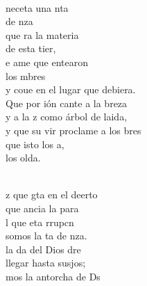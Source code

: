 \documentclass[12pt]{article}
\begin{document}
\begin{multicols*}{2}
\begin{cancion}%
	     \chord{(}{**)}{    }\\
	 neceta una nta \\
	de nza     \\
	que ra la materia \\
	de esta tier,   \\
	e ame  que entearon \\
	los mbres   \\
	y coue en el lugar que debiera.\\
	Que por ión cante a la breza\\
	y a la z como árbol de laida,\\
	y que su vir proclame a los bres\\
	que isto los a,\\
	los olda.  \\\jump\\
	\begin{chorus}%
	z que gta en el deerto  \\
	 que ancia la para\\
	l que eta rrupcn \\
	somos la ta de nza.   \\
	 la da del Dios dre   \\
	 llegar hasta susjos;\\
	mos la antorcha de Ds\\

\end{chorus}
\end{cancion}
\end{multicols*}
\end{document}
